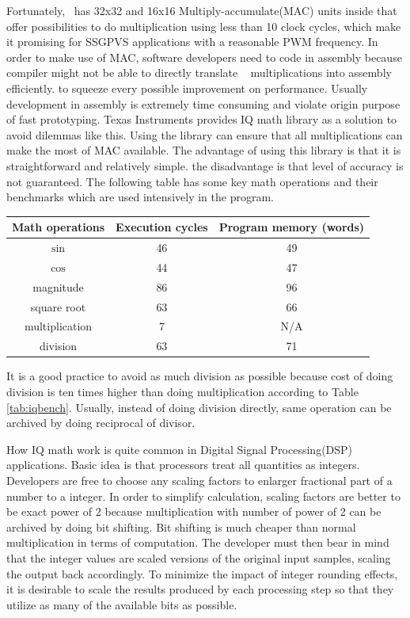 Fortunately, \tms~has 32x32 and 16x16 Multiply-accumulate(MAC) units inside that offer possibilities to do multiplication using less than 10 clock cycles, which make it promising for \gls{SSGPVS} applications with a reasonable \gls{PWM} frequency. In order to make use of MAC, software developers need to code in assembly because compiler might not be able to directly translate \fp~ multiplications into assembly efficiently. to squeeze every possible improvement on performance. Usually development in assembly is extremely time consuming and violate origin purpose of fast prototyping. Texas Instruments provides IQ math library as a solution to avoid dilemmas like this. Using the library can ensure that all multiplications can make the most of MAC available. The advantage of using this library is that it is straightforward and relatively simple. the disadvantage is that level of accuracy is not guaranteed. The following table has some key math operations and their benchmarks\cite{iqmath_lib} which are used intensively in the program. 
\begin{center}\label{tab:iqbench}
\begin{tabular}{ |c|c|c| } 
 \hline
Math operations & Execution cycles & Program memory (words)\\ \hline
$\sin$ &  46 & 49 \\ \hline
$\cos$ &  44 & 47 \\ \hline
magnitude &  86 &  96 \\ \hline
square root &  63 & 66 \\ \hline
multiplication &  7 & N/A \\ \hline
division & 63 & 71 \\ \hline
\end{tabular}
\end{center}
It is a good practice to avoid as much division as possible because cost of doing division is ten times higher than doing multiplication according to Table \ref{tab:iqbench}. Usually, instead of doing division directly, same operation can be archived by doing reciprocal of divisor. 

How IQ math work is quite common in Digital Signal Processing(DSP) applications. Basic idea is that processors treat all quantities as integers. Developers are free to choose any scaling factors to enlarger fractional part of a number to a integer. In order to simplify calculation, scaling factors are better to be exact power of 2 because multiplication with number of power of 2 can be archived by doing bit shifting. Bit shifting is much cheaper than normal multiplication in terms of computation. The developer must then bear in mind that the integer values are scaled versions of the original input samples, scaling the output back accordingly. To minimize the impact of integer rounding effects, it is desirable to scale the results produced by each processing step so that they utilize as many of the available bits as possible.

